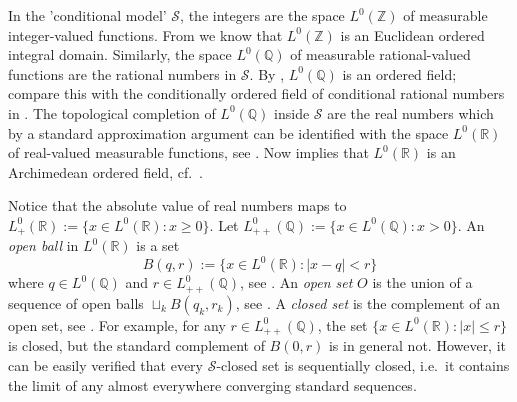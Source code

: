 \documentclass{jloganal}
\numberwithin{equation}{section}
\theoremstyle{plain}
\renewcommand{\leq}{\leqslant}
\renewcommand{\geq}{\geqslant}
\begin{document}
In the 'conditional model' $ \mathcal{S} $, the integers \cite[p.~73]{simpson2009subsystems} are the space $L^0(\mathbb{Z})$ of measurable integer-valued functions.
From \cite[Theorem II.4.1]{simpson2009subsystems} we know that $L^0(\mathbb{Z})$ is an Euclidean ordered integral domain.  
Similarly, the space $L^0(\mathbb{Q})$ of measurable rational-valued functions are the rational numbers in $\mathcal{S}$. 
By \cite[Theorem II.4.2]{simpson2009subsystems}, $L^0(\mathbb{Q})$ is an ordered field; compare this with the  conditionally ordered field of conditional rational numbers in \cite[Example 4.2.1]{drapeau2016algebra}.  
The topological completion of $L^0(\mathbb{Q})$ inside $\mathcal{S}$ are the real numbers which by a standard approximation argument can be identified with the space $L^0(\mathbb{R})$ of real-valued measurable functions, see \cite[Definition II.4.4]{simpson2009subsystems}.  
Now \cite[Theorem II.4.5]{simpson2009subsystems} implies that $L^0(\mathbb{R})$ is an Archimedean ordered field, cf.~\cite[Lemma 5.2.12 and Theorem 5.2.7]{jamneshan2014theory}.  

Notice that the absolute value of real numbers maps to $L^0_+(\mathbb{R}):=\{x\in L^0(\mathbb{R})\colon x\geq 0\}$. 
Let $L^0_{++}(\mathbb{Q}):=\{x\in L^0(\mathbb{Q})\colon x> 0\}$. 
 An \emph{open ball} in $L^0(\mathbb{R})$ is a set 
 \[
 B(q,r):=\{x\in L^0(\mathbb{R})\colon |x-q| <r\}
 \]
where $q\in L^0(\mathbb{Q})$ and $r\in L^0_{++}(\mathbb{Q})$, see \cite[p.~81]{simpson2009subsystems}.    
An \emph{open set} $O$  is the union  of a sequence of open balls $\sqcup_k B(q_k,r_k)$,  see \cite[Definition II.5.6]{simpson2009subsystems}.  
A \emph{closed set} is the complement of an open set, see \cite[Definition II.5.12]{simpson2009subsystems}.  
For example, for any $r\in L^0_{++}(\mathbb{Q})$, the set $\{x\in L^0(\mathbb{R})\colon |x| \leq r \}$ is closed, but the standard complement of $B(0,r)$ is in general not.  
However, it can be easily verified that every  $\mathcal{S}$-closed set is sequentially closed, i.e.~it  contains the limit of any almost everywhere converging standard sequences.  
\end{document}
